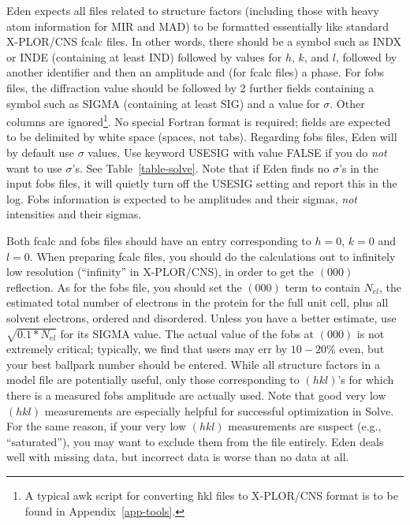 \documentclass{report}
\begin{document}
\vspace {0.1in}

Eden expects all files related to structure factors (including those
with heavy atom information for MIR and MAD) to be 
formatted essentially like standard X-PLOR/CNS 
fcalc files.  In other words,
there should be a symbol such as INDX or INDE (containing at least IND) 
followed by values for $h$, $k$, and $l$, followed by another identifier
and then an amplitude and (for fcalc files) a phase. For fobs files, the
diffraction value should be followed by 2 further fields containing 
a symbol such as SIGMA (containing at least SIG) and a value for $\sigma$.  
Other columns are ignored\footnote{A typical awk script 
for converting \.hkl
files to X-PLOR/CNS format 
is to be found in Appendix~\ref{app-tools}.}.
No special Fortran format is required; fields are expected to be delimited
by white space (spaces, not tabs).  Regarding fobs files, Eden will by default 
use $\sigma$ values.  Use keyword USESIG
with value FALSE if you do {\em not}
want to use $\sigma$'s. See Table~\ref{table-solve}.
Note that if Eden finds no $\sigma$'s in the input fobs files, it
will quietly turn off the USESIG setting and 
report this in the log.
Fobs information is expected to be amplitudes and their sigmas, {\em not}
intensities and their sigmas.

\vspace {0.1in}

Both fcalc and fobs files should have an entry corresponding to
$h = 0$, $k = 0$ and $l = 0$.
When preparing fcalc files, you should do the calculations out to 
infinitely low resolution (``infinity'' in X-PLOR/CNS),
in order to get the $(0 0 0)$ reflection.  
As for the fobs file, you should set the $(0 0 0)$ term to contain  $N_{el}$,
the estimated total number of electrons in the protein for the full unit cell,
plus all solvent
electrons, ordered and disordered.  Unless you have a better estimate,
use $\sqrt{0.1 * N_{el}}$ for its SIGMA value.
The actual value of the fobs at $(0 0 0)$ is not extremely critical;
typically, we find that users may err by $10 - 20\%$ even, but your best
ballpark number should be entered.
While all structure factors in a model file are potentially useful, only
those corresponding to $(h k l)$'s for which there is a measured fobs amplitude
are actually used.  Note that good very low $(h k l)$ measurements are 
especially helpful for successful optimization in Solve.  
For the same reason, if your very low $(h k l)$ measurements are suspect 
(e.g., ``saturated''), you may want to exclude them from the file entirely.
Eden deals well with missing data, but incorrect data is worse than no 
data at all. \cite{lanczos}
\end{document}
